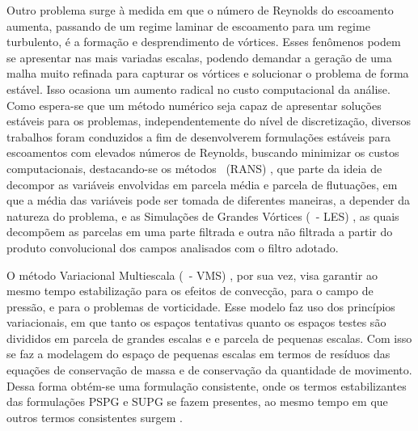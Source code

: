 Outro problema surge à medida em que o número de Reynolds do escoamento aumenta, passando de um regime laminar de escoamento para um regime turbulento, é a formação e desprendimento de vórtices. Esses fenômenos podem se apresentar nas mais variadas escalas, podendo demandar a geração de uma malha muito refinada para capturar os vórtices e solucionar o problema de forma estável. Isso ocasiona um aumento radical no custo computacional da análise. Como espera-se que um método numérico seja capaz de apresentar soluções estáveis para os problemas, independentemente do nível de discretização, diversos trabalhos foram conduzidos a fim de desenvolverem formulações estáveis para escoamentos com elevados números de Reynolds, buscando minimizar os custos computacionais, destacando-se  os métodos \RANS\ (RANS) \cite{speziale1991analytical,alfonsi2009reynolds,ling2015evaluation}, que parte da ideia de decompor as variáveis envolvidas em parcela média e parcela de flutuações, em que a média das variáveis pode ser tomada de diferentes maneiras, a depender da natureza do problema, e as Simulações de Grandes Vórtices (\LES\ - LES) \cite{germano1991dynamic,piomelli1999large,hughes2000large,vsekutkovski2021partitioned}, as quais decompõem as parcelas em uma parte filtrada e outra não filtrada a partir do produto convolucional dos campos analisados com o filtro adotado.

O método Variacional Multiescala (\VMS\ - VMS) \cite{hughes1995multiscale,hughes1998variational,hughes2002variational,bazilevs2010large,bazilevs2013computational}, por sua vez, visa garantir ao mesmo tempo estabilização para os efeitos de convecção, para o campo de pressão, e para o problemas de vorticidade. Esse modelo faz uso dos princípios variacionais, em que tanto os espaços tentativas quanto os espaços testes são divididos em parcela de grandes escalas e e parcela de pequenas escalas. Com isso se faz a modelagem do espaço de pequenas escalas em termos de resíduos das equações de conservação de massa e de conservação da quantidade de movimento. Dessa forma obtém-se uma formulação consistente, onde os termos estabilizantes das formulações PSPG e SUPG se fazem presentes, ao mesmo tempo em que outros termos consistentes surgem \cite{bazilevs2013computational,sondak2015new}.

\begin{comment}
\textcolor{red}{Faltou falar sobre o problema de contornos móveis (introduzir ALE, Spaço-tempo e contorno imerso como possibilidades de solução )}
\textcolor{red}{ALE: \cite{donea1982arbitrary,hughes1981lagrangian,bazilevs2015ale}\\}
\textcolor{red}{Espaço-tempo: \cite{aliabadi1993space,hughes1996space,hughes2000large}\\}
\textcolor{red}{Contorno imerso: \cite{peskin1972flow,peskin1977numerical,akkerman2012free}\\}
\end{comment}


